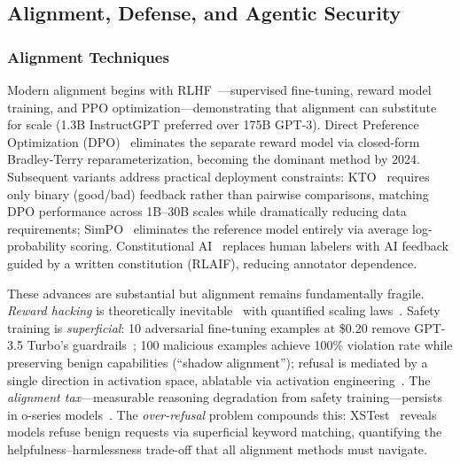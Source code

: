 \subsection{Alignment, Defense, and Agentic Security}
\label{sec:alignment}

\subsubsection{Alignment Techniques}
\label{sec:alignment-tech}

Modern alignment begins with RLHF~\cite{ouyang2022rlhf}---supervised fine-tuning, reward model training, and PPO optimization---demonstrating that alignment can substitute for scale (1.3B InstructGPT preferred over 175B GPT-3). Direct Preference Optimization (DPO)~\cite{rafailov2023dpo} eliminates the separate reward model via closed-form Bradley-Terry reparameterization, becoming the dominant method by 2024. Subsequent variants address practical deployment constraints: KTO~\cite{ethayarajh2024kto} requires only binary (good/bad) feedback rather than pairwise comparisons, matching DPO performance across 1B--30B scales while dramatically reducing data requirements; SimPO~\cite{meng2024simpo} eliminates the reference model entirely via average log-probability scoring. Constitutional AI~\cite{bai2022constitutionalai} replaces human labelers with AI feedback guided by a written constitution (RLAIF), reducing annotator dependence.

These advances are substantial but alignment remains fundamentally fragile. \emph{Reward hacking} is theoretically inevitable~\cite{skalse2022rewardhacking} with quantified scaling laws~\cite{gao2023scalinglaws}. Safety training is \emph{superficial}: 10 adversarial fine-tuning examples at \$0.20 remove GPT-3.5 Turbo's guardrails~\cite{qi2024finetuning}; 100 malicious examples achieve 100\% violation rate while preserving benign capabilities (``shadow alignment''); refusal is mediated by a single direction in activation space, ablatable via activation engineering~\cite{arditi2024refusal}. The \emph{alignment tax}---measurable reasoning degradation from safety training---persists in o-series models~\cite{huang2025safetytax}. The \emph{over-refusal} problem compounds this: XSTest~\cite{rottger2024xstest} reveals models refuse benign requests via superficial keyword matching, quantifying the helpfulness--harmlessness trade-off that all alignment methods must navigate.


